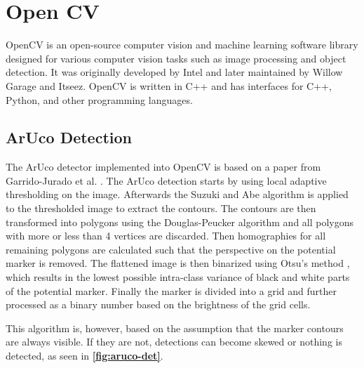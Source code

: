 \documentclass[10pt]{book}
\newcommand{\figureref}[1]{\textbf{\autoref{#1}}}
\begin{document}
\section{Open CV}

\ac{OpenCV} is an open-source computer vision and machine learning software library designed for various computer vision tasks such as image processing and object detection. It was originally developed by Intel and later maintained by Willow Garage and Itseez. \ac{OpenCV} is written in C++ and has interfaces for C++, Python, and other programming languages.

\subsection{ArUco Detection}
\label{sec:aruco_det}

The \ac{ArUco} detector implemented into \ac{OpenCV} is based on a paper from Garrido-Jurado et al. \cite{garrido2014automatic}. The \ac{ArUco} detection starts by using local adaptive thresholding on the image. Afterwards the Suzuki
and Abe algorithm \cite{SUZUKI198532} is applied to the thresholded image to extract the contours. The contours are then transformed into polygons using the Douglas-Peucker algorithm \cite{douglas1973algorithms} and all polygons with more or less than 4 vertices are discarded. Then homographies for all remaining polygons are calculated such that the perspective on the potential marker is removed. The flattened image is then binarized using Otsu's method \cite{4310076}, which results in the lowest possible intra-class variance of black and white parts of the potential marker. Finally the marker is divided into a grid and further processed as a binary number based on the brightness of the grid cells.

This algorithm is, however, based on the assumption that the marker contours are always visible. If they are not, detections can become skewed or nothing is detected, as seen in \figureref{fig:aruco-det}.
\end{document}
